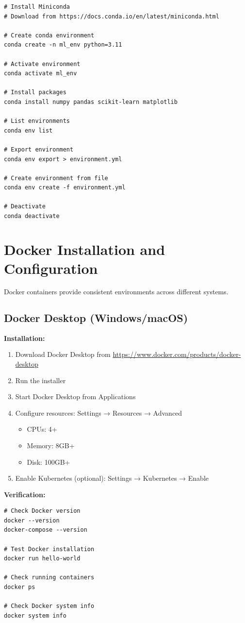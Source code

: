\begin{lstlisting}[style=shell]
# Install Miniconda
# Download from https://docs.conda.io/en/latest/miniconda.html

# Create conda environment
conda create -n ml_env python=3.11

# Activate environment
conda activate ml_env

# Install packages
conda install numpy pandas scikit-learn matplotlib

# List environments
conda env list

# Export environment
conda env export > environment.yml

# Create environment from file
conda env create -f environment.yml

# Deactivate
conda deactivate
\end{lstlisting}

\section{Docker Installation and Configuration}

Docker containers provide consistent environments across different systems.

\subsection{Docker Desktop (Windows/macOS)}

\textbf{Installation:}
\begin{enumerate}
    \item Download Docker Desktop from \url{https://www.docker.com/products/docker-desktop}
    \item Run the installer
    \item Start Docker Desktop from Applications
    \item Configure resources: Settings → Resources → Advanced
    \begin{itemize}
        \item CPUs: 4+
        \item Memory: 8GB+
        \item Disk: 100GB+
    \end{itemize}
    \item Enable Kubernetes (optional): Settings → Kubernetes → Enable
\end{enumerate}

\textbf{Verification:}
\begin{lstlisting}[style=shell]
# Check Docker version
docker --version
docker-compose --version

# Test Docker installation
docker run hello-world

# Check running containers
docker ps

# Check Docker system info
docker system info
\end{lstlisting}

